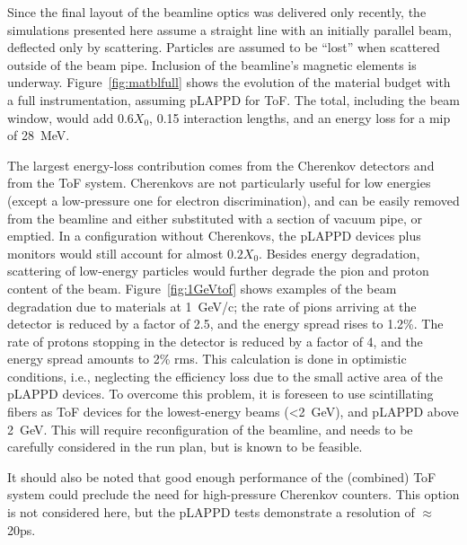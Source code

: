 Since the final layout of the beamline optics was delivered only recently, the simulations presented here assume a straight line with an initially parallel beam, deflected only by scattering. Particles are assumed to be ``lost'' when scattered outside of the beam pipe. Inclusion of the beamline's magnetic elements is underway. 
 Figure~\ref{fig:matblfull} shows the evolution of the material budget with a full instrumentation, assuming pLAPPD for ToF. The total, including the beam window, would add $0.6X_0$, 0.15 interaction lengths, and an energy loss for a mip of 28~MeV.

The largest energy-loss contribution comes from the Cherenkov detectors and from the  ToF system. Cherenkovs are not particularly useful for low energies (except a low-pressure one for electron discrimination), and can be easily removed from the beamline and either substituted with a section of vacuum pipe, or emptied.  
In a configuration %
without Cherenkovs, the pLAPPD devices plus monitors would still account for almost  $0.2X_0$. Besides energy degradation, scattering of low-energy particles would  further degrade the pion and proton content of the beam.  Figure~\ref{fig:1GeVtof} shows examples of the beam degradation due to materials at 1~GeV/c; the rate of pions arriving at the detector is reduced by a factor of 2.5, and the energy spread rises to 1.2\%. The rate of protons stopping in the detector is reduced by a factor of 4, and the energy spread amounts to 2\% rms. This calculation is done in optimistic conditions, i.e., neglecting the efficiency loss due to the small active area of the pLAPPD devices.
%
To overcome this problem, it is foreseen to use scintillating fibers as ToF devices for the lowest-energy beams (<2~GeV), and pLAPPD above 2~GeV.
   This will require reconfiguration of the beamline, and needs to be carefully considered in the run plan, but is known to be feasible. %

It should also be noted that good enough performance of the (combined) ToF system could preclude the need for high-pressure  Cherenkov counters. 
This option is not considered here, but %
 the pLAPPD tests demonstrate a resolution of $\approx$20ps.

